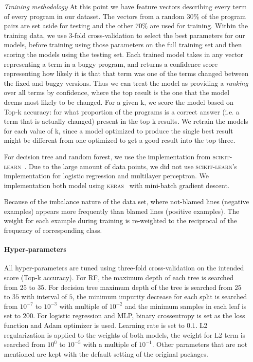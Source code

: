 \documentclass[conference]{IEEEtran}
\begin{document}
\emph{Training methodology} At this point we have feature vectors describing every term of every program in
our dataset. The vectors from a random 30\% of the program pairs are set aside for testing and
the other 70\% are used for training.
Within the training data, we use 3-fold
cross-validation to select the best parameters for our models, before training
using those parameters on the full training set and then scoring the models
using the testing set.
Each trained model takes in any vector representing a term
in a buggy program, and returns a confidence score representing how likely it is that
that term was one of the terms changed between the fixed and buggy versions.
Thus we can treat the model as providing a \emph{ranking} over all terms by
confidence, where the top result is the one that the model deems most likely
to be changed.
For a given k, we score the model based on Top-k accuracy: for what
proportion of the programs is a correct answer (i.e. a term that is actually
changed) present in the top k results.
We retrain the models for each value of k, since a model optimized to produce
the single best result might be different from one optimized to get a good
result into the top three.

For decision tree and random forest, we use the implementation from
\textsc{scikit-learn}~\cite{scikit-learn}.
Due to the large amount of data points, we did not use \textsc{scikit-learn}'s
implementation for logistic regression and multilayer perceptron.
We implementation both model using
\textsc{keras}~\cite{chollet2015keras} with mini-batch gradient descent.

Because of the imbalance nature of the data set, where not-blamed lines
(negative examples) appears more frequently than blamed lines (positive
examples).
The weight for each example during training is re-weighted to the reciprocal
of the frequency of corresponding class.

\paragraph{Hyper-parameters}
All hyper-parameters are tuned using three-fold cross-validation on the
intended score (Top-k accuracy).
For RF, the maximum depth of each tree is searched from $25$ to $35$.
For decision tree maximum depth of the tree is searched from $25$ to $35$ with interval of $5$,
the minimum impurity decrease for each split is searched from $10^{-7}$ to
$10^{-3}$ with multiple of $10^{-2}$ and the minimum samples in each leaf is set to $200$.
For logistic regression and MLP, binary crossentropy is set as the loss
function and Adam \cite{kingma2014adam} optimizer is used.
Learning rate is set to $0.1$.
L2 regularization is applied to the weights of both models,
the weight for L2 term is searched from $10^0$ to $10^{-5}$ with a multiple of $10^{-1}$.
Other parameters that are not mentioned are kept with the default setting of the
original packages.
\end{document}
